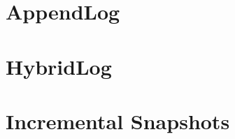 \section{AppendLog}


\section{HybridLog}


\section{Incremental Snapshots}
\label{section-incremental-snapshots}
